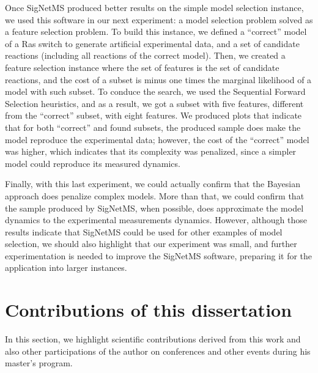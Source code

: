Once SigNetMS produced better results on the simple model selection
instance, we used this software in our next experiment: a model
selection problem solved as a feature selection problem. To build this
instance, we defined a ``correct'' model of a Ras switch to generate
artificial experimental data, and a set of candidate reactions
(including all reactions of the correct model). Then, we created a
feature selection instance where the set of features is the set of
candidate reactions, and the cost of a subset is minus one times the
marginal likelihood of a model with such subset. To conduce the search,
we used the Sequential Forward Selection heuristics, and as a result, we
got a subset with five features, different from the ``correct'' subset,
with eight features. We produced plots that indicate that for both
``correct'' and found subsets, the produced sample does make the model
reproduce the experimental data; however, the cost of the ``correct''
model was higher, which indicates that its complexity was penalized,
since a simpler model could reproduce its measured dynamics.

Finally, with this last experiment, we could actually confirm that the
Bayesian approach does penalize complex models. More than that, we could
confirm that the sample produced by SigNetMS, when possible, does
approximate the model dynamics to the experimental measurements
dynamics. However, although those results indicate that SigNetMS could be used for
other examples of model selection, we should also highlight that our
experiment was small, and further experimentation is needed to improve
the SigNetMS software, preparing it for the application into larger instances.

\section{Contributions of this dissertation}
In this section, we highlight scientific contributions derived from this
work and also other participations of the author on conferences and
other events during his master's program.

